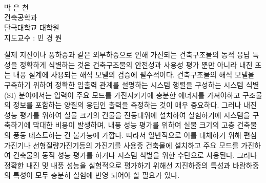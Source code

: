 \begin{center}
 \\
\vspace*{0.3cm}
 \\
\vspace*{0.3cm}
 \\

\end{center}
\begin{flushright}
박 은 천\\
건축공학과\\
단국대학교 대학원\\
\vspace{0.3cm}
지도교수 : 민 경 원
\end{flushright}

\setlength{\baselineskip}{1.5\baselineskip}
실제 지진이나 풍하중과 같은 외부하중으로 인해 가진되는 건축구조물의 동적 응답 특성을 정확하게 식별하는 것은 건축구조물의 안전성과 사용성 평가 뿐만 아니라 내진 또는 내풍 설계에 사용되는 해석 모델의 검증에 필수적이다. 건축구조물의 해석 모델을 구축하기 위하여 정확한 입출력 관계를 설명하는 시스템 행렬을 구성하는 시스템 식별 (SI) 분야에서는 입력이 주요 모드를 가진시키기에 충분한 에너지를 가져야하고 구조물의 정보를 포함하는 양질의 응딥인 출력을 측정하는 것이 매우 중요하다. 그러나 내진 성능 평가를 위하여 실물 크기의 건물을 진동대위에 설치하여 실험하기에 시스템을 구축하기에 막대한 비용이 발생하며, 내풍 성능 평가를 위하여 실물 크기의 고층 건축물의 풍동 테스트하는 건 불가능에 가깝다. 따라서 일반적으로 이를 대체하기 위해 편심가진기나 선형질량가진기등의 가진기를 사용중 건축물에 설치하고 주요 모드를 가진하여 건축물의 동적 성능 평가를 하거나 시스템 식별을 위한 수단으로 사용된다. 그러나 정확한 내진 및 내풍 성능을 실험적으로 평가하기 위해선 지진하중의 특성과 바람하중의 특성이 모두 충분히 실험에 반영 되어야 할 필요가 있다.


